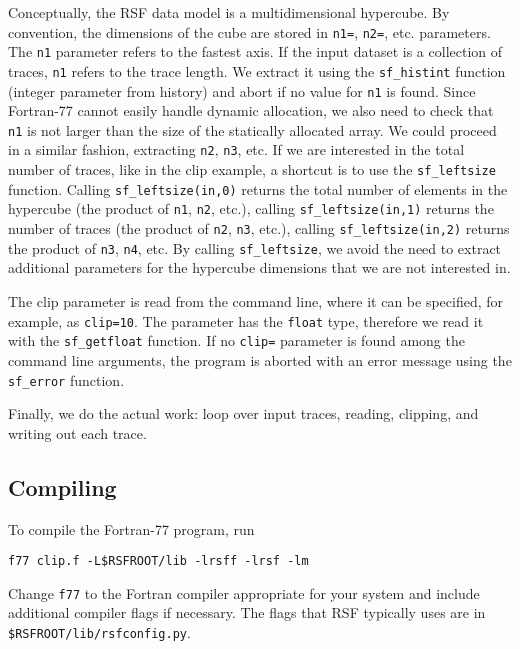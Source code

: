 
Conceptually, the RSF data model is a multidimensional hypercube. By
convention, the dimensions of the cube are stored in \texttt{n1=},
\texttt{n2=}, etc. parameters. The \texttt{n1} parameter refers to the fastest
axis. If the input dataset is a collection of traces, \texttt{n1} refers to
the trace length. We extract it using the \texttt{sf\_histint} function
(integer parameter from history) and abort if no value for \texttt{n1} is
found. Since Fortran-77 cannot easily handle dynamic allocation, we also need
to check that \texttt{n1} is not larger than the size of the statically
allocated array. We could proceed in a similar fashion, extracting
\texttt{n2}, \texttt{n3}, etc. If we are interested in the total number of
traces, like in the clip example, a shortcut is to use the
\texttt{sf\_leftsize} function.  Calling \texttt{sf\_leftsize(in,0)} returns
the total number of elements in the hypercube (the product of \texttt{n1},
\texttt{n2}, etc.), calling \texttt{sf\_leftsize(in,1)} returns the number of
traces (the product of \texttt{n2}, \texttt{n3}, etc.), calling
\texttt{sf\_leftsize(in,2)} returns the product of \texttt{n3}, \texttt{n4},
etc. By calling \texttt{sf\_leftsize}, we avoid the need to extract additional
parameters for the hypercube dimensions that we are not interested in.

 The
clip parameter is read from the command line, where it can be specified, for
example, as \texttt{clip=10}. The parameter has the \texttt{float} type,
therefore we read it with the \texttt{sf\_getfloat} function. If no
\texttt{clip=} parameter is found among the command line arguments, the
program is aborted with an error message using the \texttt{sf\_error}
function.


Finally, we do the actual work: loop over input traces, reading, clipping, and
writing out each trace. 

\subsection{Compiling}

To compile the Fortran-77 program, run
\begin{verbatim}
f77 clip.f -L$RSFROOT/lib -lrsff -lrsf -lm
\end{verbatim}
Change \texttt{f77} to the Fortran compiler appropriate for your system and
include additional compiler flags if necessary. The flags that RSF typically
uses are in \texttt{\$RSFROOT/lib/rsfconfig.py}.

